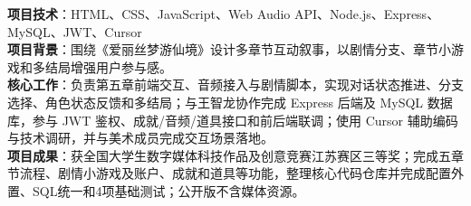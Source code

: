 
\textbf{项目技术}：HTML、CSS、JavaScript、Web Audio API、Node.js、Express、MySQL、JWT、Cursor\\
\textbf{项目背景}：围绕《爱丽丝梦游仙境》设计多章节互动叙事，以剧情分支、章节小游戏和多结局增强用户参与感。\\
\textbf{核心工作}：负责第五章前端交互、音频接入与剧情脚本，实现对话状态推进、分支选择、角色状态反馈和多结局；与王智龙协作完成 Express 后端及 MySQL 数据库，参与 JWT 鉴权、成就/音频/道具接口和前后端联调；使用 Cursor 辅助编码与技术调研，并与美术成员完成交互场景落地。\\
\textbf{项目成果}：获全国大学生数字媒体科技作品及创意竞赛江苏赛区三等奖；完成五章节流程、剧情小游戏及账户、成就和道具等功能，整理核心代码仓库并完成配置外置、SQL统一和4项基础测试；公开版不含媒体资源。\\
